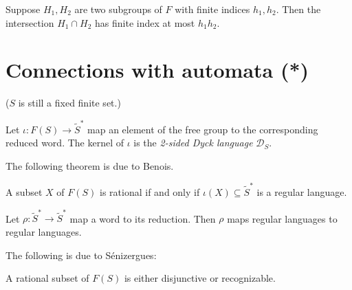 \begin{theorem}\label{thm:howson-neumann}
  Suppose $H_1,H_2$ are two subgroups of $F$ with finite indices $h_1,h_2$.
  Then the intersection $H_1\cap H_2$ has finite index at most $h_1h_2$.
\end{theorem}

\section{Connections with automata (*)}

($S$ is still a fixed finite set.)

Let $\iota : F(S) \to \tilde S^*$ map an element of the free group to the corresponding reduced word.
The kernel of $\iota$ is the \emph{2-sided Dyck language} $\mathcal D_S$.

The following theorem is due to Benois.
\begin{theorem}
  A subset $X$ of $F(S)$ is rational if and only if
  $\iota(X)\subseteq \tilde S^*$ is a regular language.
\end{theorem}

\begin{lemma}
  Let $\rho : \tilde S^* \to \tilde S^*$ map a word to its reduction.
  Then $\rho$ maps regular languages to regular languages.
\end{lemma}

The following is due to Sénizergues:
\begin{theorem}
  A rational subset of $F(S)$ is either disjunctive or recognizable.
\end{theorem}

